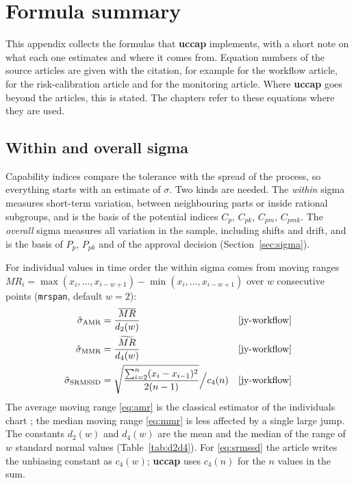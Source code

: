 \documentclass[a4paper,11pt,oneside,openany,parskip=half-,headings=standardclasses,toc=flat,numbers=noenddot]{scrbook}
\newcommand{\code}[1]{\texttt{\begingroup\def\_{\textunderscore\allowbreak}#1\endgroup}}
\newcommand{\pkg}{\textsf{\bfseries uccap}}
\newcommand{\secref}[1]{Section~\ref{#1}}
\newcommand{\tabref}[1]{Table~\ref{#1}}
\begin{document}
\appendix
{}

\chapter{Formula summary}\label{app:formulas}

This appendix collects the formulas that \pkg{} implements, with a short note on what each one estimates and where
it comes from. Equation numbers of the source articles are given with the citation, for example \cite[Eq.~(4)]{jy-workflow} for the
workflow article, \cite[Eq.~(26)]{jy-risk} for the risk-calibration article and
\cite[Eq.~(25)]{jy-monitor} for the monitoring article. Where
\pkg{} goes beyond the articles, this is stated. The chapters refer to these equations where they are used.

\section{Within and overall sigma}\label{app:f-sigma}

Capability indices compare the tolerance with the spread of the process, so everything starts with an estimate of
$\sigma$. Two kinds are needed. The \emph{within} sigma measures short-term variation, between neighbouring parts or
inside rational subgroups, and is the basis of the potential indices $C_p$, $C_{pk}$, $C_{pm}$, $C_{pmk}$. The
\emph{overall} sigma measures all variation in the sample, including shifts and drift, and is the basis of $P_p$,
$P_{pk}$ and of the approval decision (\secref{sec:sigma}).

For individual values in time order the within sigma comes from moving ranges
$MR_i = \max(x_i,\dots,x_{i-w+1}) - \min(x_i,\dots,x_{i-w+1})$ over $w$ consecutive points (\code{mr\_span}, default
$w = 2$):
\begin{align}
\hat\sigma_{\text{AMR}} &= \frac{\overline{MR}}{d_2(w)} && \text{\cite[Eq.~(28)]{jy-workflow}}\label{eq:amr}\\
\hat\sigma_{\text{MMR}} &= \frac{\widetilde{MR}}{d_4(w)} && \text{\cite[Eq.~(29)]{jy-workflow}}\label{eq:mmr}\\
\hat\sigma_{\text{SRMSSD}} &= \sqrt{\frac{\sum_{i=2}^{n}(x_i-x_{i-1})^2}{2(n-1)}}\Big/c_4(n) && \text{\cite[Eq.~(30)]{jy-workflow}}\label{eq:srmssd}
\end{align}
The average moving range \eqref{eq:amr} is the classical estimator of the individuals chart \cite{montgomery}; the
median moving range \eqref{eq:mmr} is less affected by a single large jump. The constants $d_2(w)$ and $d_4(w)$ are
the mean and the median of the range of $w$ standard normal values (\tabref{tab:d2d4}). For \eqref{eq:srmssd} the
article writes the unbiasing constant as $c_4(w)$; \pkg{} uses $c_4(n)$ for the $n$ values in the sum.
\end{document}
